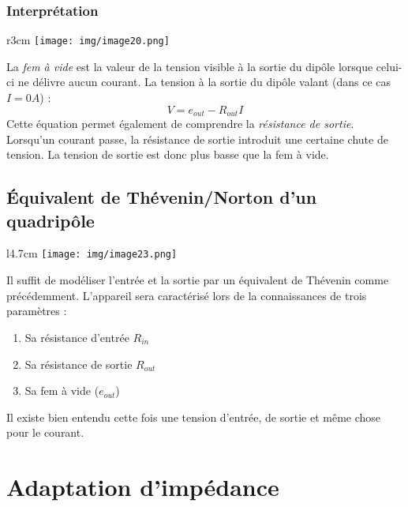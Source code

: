 \documentclass[british,french,11pt, a4paper, openany]{book}
\begin{document}
		\subsubsection{Interprétation}
		\begin{wrapfigure}[8]{r}{3cm}
			\texttt{[image: img/image20.png]}
		\end{wrapfigure}
		La \textit{fem à vide} est la valeur de la tension visible à la sortie du dipôle lorsque celui-ci ne délivre aucun courant. La tension à la sortie du dipôle valant (dans ce cas $I = 0A$) :
		\begin{equation}
		V = e_{out} - R_{out}I
		\end{equation}
		Cette équation permet également de comprendre la \textit{résistance de sortie}. Lorsqu'un courant passe, la résistance de sortie introduit une certaine chute de tension. La tension de sortie est donc plus basse que la fem à vide.\\
		
		
		
		\setcounter{subsection}{3}
		\subsection{Équivalent de Thévenin/Norton d'un quadripôle}
		\begin{wrapfigure}[8]{l}{4.7cm}
			\texttt{[image: img/image23.png]}
		\end{wrapfigure}
		Il suffit de modéliser l'entrée et la sortie par un équivalent de Thévenin comme précédemment. L'appareil sera caractérisé lors de la connaissances de trois paramètres :
		\begin{enumerate}
			\item Sa résistance d'entrée $R_{in}$
			\item Sa résistance de sortie $R_{out}$
			\item Sa fem à vide ($e_{out}$)
		\end{enumerate}
		Il existe bien entendu cette fois une tension d'entrée, de sortie et même chose pour le courant.
		
		
		\section{Adaptation d'impédance}
\end{document}
